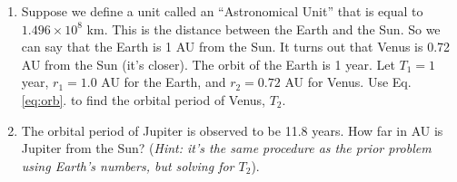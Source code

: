 \documentclass{article}
\begin{document}
\begin{enumerate}
\item Suppose we define a unit called an ``Astronomical Unit'' that is equal to $1.496\times 10^8$ km.  This is the distance between the Earth and the Sun.  So we can say that the Earth is 1 AU from the Sun.  It turns out that Venus is 0.72 AU from the Sun (it's closer).  The orbit of the Earth is 1 year.  Let $T_1 = 1$ year, $r_1 = 1.0$ AU for the Earth, and $r_2 = 0.72$ AU for Venus.  Use Eq. \ref{eq:orb}. to find the orbital period of Venus, $T_2$. \\ \vspace{1cm}
\item The orbital period of Jupiter is observed to be 11.8 years.  How far in AU is Jupiter from the Sun?  (\textit{Hint: it's the same procedure as the prior problem using Earth's numbers, but solving for $T_2$}). \\ \vspace{1cm}
\end{enumerate}
\end{document}
